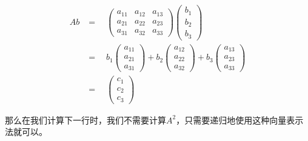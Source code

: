 \documentclass{ctexart}
\begin{document}
\begin{equation}
    \begin{aligned}
        Ab& = \quad
        \begin{pmatrix}
            a_{11} & a_{12} & a_{13} \\
            a_{21} & a_{22} & a_{23} \\
            a_{31} & a_{32} & a_{33}
        \end{pmatrix}
        \begin{pmatrix}
            b_{1} \\
            b_{2} \\
            b_{3}
        \end{pmatrix}     \\
                 & = \quad
        b_{1}
        \begin{pmatrix}
            a_{11} \\
            a_{21} \\
            a_{31}
        \end{pmatrix}
        +
        b_{2}
        \begin{pmatrix}
            a_{12} \\
            a_{22} \\
            a_{32}
        \end{pmatrix}
        +
        b_{3}
        \begin{pmatrix}
            a_{13} \\
            a_{23} \\
            a_{33}
        \end{pmatrix}     \\
                 & = \quad
        \begin{pmatrix}
            c_1 \\
            c_2 \\
            c_3
        \end{pmatrix}
        \label{eq:4}
    \end{aligned}
\end{equation}

那么在我们计算下一行时，我们不需要计算$A^2$，只需要递归地使用这种向量表示法就可以。
\end{document}
